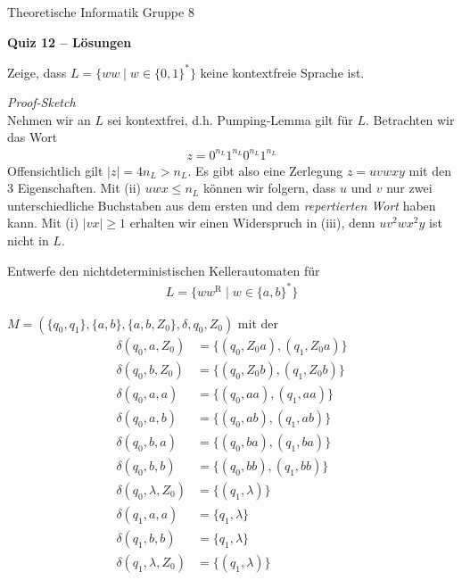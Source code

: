 \documentclass[a4paper,ngerman,12pt]{exam}
\begin{document}
\noindent Theoretische Informatik \hfill Gruppe 8
\begin{center}
  \bfseries\Large
  Quiz 12 \ifprintanswers
  -- Lösungen
\fi
\end{center}


\begin{questions}
\question
  Zeige, dass $L = \{ww \mid w \in \{0,1\}^*\}$ keine kontextfreie Sprache ist.
  \begin{solutionorbox}[18em] $ $ \\
    \textit{Proof-Sketch} \\
    Nehmen wir an $L$ sei kontextfrei, d.h. Pumping-Lemma gilt für $L$.
    Betrachten wir das Wort
    \begin{align*}
      z = 0^{n_L}1^{n_L}0^{n_L}1^{n_L}
    \end{align*}
    Offensichtlich gilt $|z| = 4n_L > n_L$. Es gibt also eine Zerlegung
    $z = uvwxy$ mit den 3 Eigenschaften. Mit (ii) $uwx \leq n_L$ können
    wir folgern, dass $u$ und $v$ nur zwei unterschiedliche Buchstaben
    aus dem ersten und dem \textit{repertierten Wort} haben kann.
    Mit (i) $|vx| \geq 1$ erhalten wir einen Widerspruch in (iii), denn
    $uv^2wx^2y$ ist nicht in $L$.
  \end{solutionorbox}

  \question
  Entwerfe den nichtdeterministischen Kellerautomaten für
  \begin{align*}
    L = \{ww^{\mathrm{R}} \mid w \in \{a,b\}^*\}
  \end{align*}
  \begin{solutionorbox}[20em] $ $ \\
    $M = (\{q_0,q_1\}, \{a,b\},\{a,b,Z_0\}, \delta, q_0, Z_0)$ mit
    der
    \begin{align*}
      \delta(q_0, a, Z_0) &= \{(q_0, Z_0a),(q_1, Z_0a)\} \\
      \delta(q_0, b, Z_0) &= \{(q_0, Z_0b),(q_1, Z_0b)\} \\
      \delta(q_0, a, a) &= \{(q_0, aa),(q_1, aa)\} \\
      \delta(q_0, a, b) &= \{(q_0, ab),(q_1, ab)\} \\
      \delta(q_0, b, a) &= \{(q_0, ba),(q_1, ba)\} \\
      \delta(q_0, b, b) &= \{(q_0, bb),(q_1, bb)\} \\
      \delta(q_0, \lambda, Z_0) &= \{(q_1, \lambda)\} \\
      \delta(q_1, a, a) &= \{q_1, \lambda\} \\
      \delta(q_1, b, b) &= \{q_1, \lambda\} \\
      \delta(q_1, \lambda, Z_0) &= \{(q_1, \lambda)\}
    \end{align*}
  \end{solutionorbox}
\end{questions}
\end{document}
